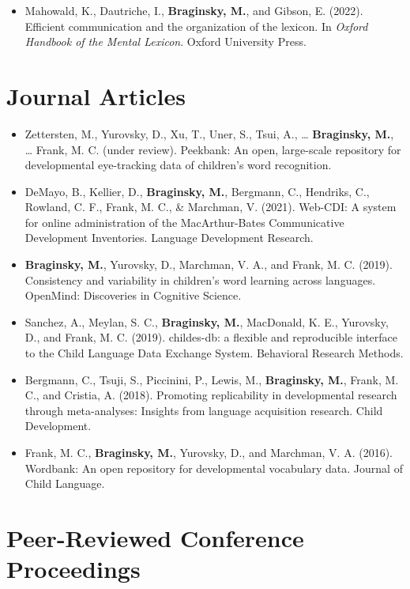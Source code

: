 \documentclass[11pt,]{article}
\providecommand{\tightlist}{%
  \setlength{\itemsep}{0pt}\setlength{\parskip}{0pt}}
\begin{document}
\begin{itemize}
\tightlist
\item
  Mahowald, K., Dautriche, I., \textbf{Braginsky, M.}, and Gibson, E.
  (2022). Efficient communication and the organization of the lexicon.
  In \emph{Oxford Handbook of the Mental Lexicon}. Oxford University
  Press.
\end{itemize}

\hypertarget{journal-articles}{%
\section{Journal Articles}\label{journal-articles}}

\begin{itemize}
\item
  Zettersten, M., Yurovsky, D., Xu, T., Uner, S., Tsui, A., \ldots{}
  \textbf{Braginsky, M.}, \ldots{} Frank, M. C. (under review).
  Peekbank: An open, large-scale repository for developmental
  eye-tracking data of children's word recognition.
\item
  DeMayo, B., Kellier, D., \textbf{Braginsky, M.}, Bergmann, C.,
  Hendriks, C., Rowland, C. F., Frank, M. C., \& Marchman, V. (2021).
  Web-CDI: A system for online administration of the MacArthur-Bates
  Communicative Development Inventories. Language Development Research.
\item
  \textbf{Braginsky, M.}, Yurovsky, D., Marchman, V. A., and Frank, M.
  C. (2019). Consistency and variability in children's word learning
  across languages. OpenMind: Discoveries in Cognitive Science.
\item
  Sanchez, A., Meylan, S. C., \textbf{Braginsky, M.}, MacDonald, K. E.,
  Yurovsky, D., and Frank, M. C. (2019). childes-db: a flexible and
  reproducible interface to the Child Language Data Exchange System.
  Behavioral Research Methods.
\item
  Bergmann, C., Tsuji, S., Piccinini, P., Lewis, M., \textbf{Braginsky,
  M.}, Frank, M. C., and Cristia, A. (2018). Promoting replicability in
  developmental research through meta-analyses: Insights from language
  acquisition research. Child Development.
\item
  Frank, M. C., \textbf{Braginsky, M.}, Yurovsky, D., and Marchman, V.
  A. (2016). Wordbank: An open repository for developmental vocabulary
  data. Journal of Child Language.
\end{itemize}

\hypertarget{peer-reviewed-conference-proceedings}{%
\section{Peer-Reviewed Conference
Proceedings}\label{peer-reviewed-conference-proceedings}}
\end{document}
